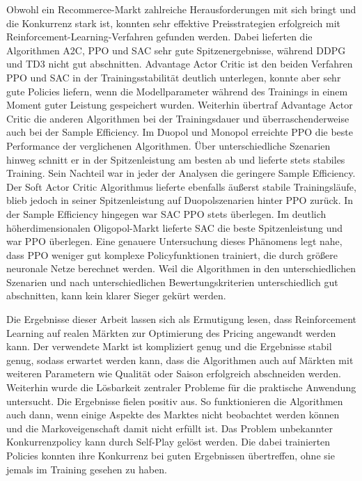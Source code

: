 Obwohl ein Recommerce-Markt zahlreiche Herausforderungen mit sich bringt und die Konkurrenz stark ist, konnten sehr effektive Preisstrategien erfolgreich mit Reinforcement-Learning-Verfahren gefunden werden.
Dabei lieferten die Algorithmen A2C, PPO und SAC sehr gute Spitzenergebnisse, während DDPG und TD3 nicht gut abschnitten.
Advantage Actor Critic ist den beiden Verfahren PPO und SAC in der Trainingsstabilität deutlich unterlegen, konnte aber sehr gute Policies liefern, wenn die Modellparameter während des Trainings in einem Moment guter Leistung gespeichert wurden.
Weiterhin übertraf Advantage Actor Critic die anderen Algorithmen bei der Trainingsdauer und überraschenderweise auch bei der Sample Efficiency.
Im Duopol und Monopol erreichte PPO die beste Performance der verglichenen Algorithmen.
Über unterschiedliche Szenarien hinweg schnitt er in der Spitzenleistung am besten ab und lieferte stets stabiles Training.
Sein Nachteil war in jeder der Analysen die geringere Sample Efficiency.
Der Soft Actor Critic Algorithmus lieferte ebenfalls äußerst stabile Trainingsläufe, blieb jedoch in seiner Spitzenleistung auf Duopolszenarien hinter PPO zurück.
In der Sample Efficiency hingegen war SAC PPO stets überlegen.
Im deutlich höherdimensionalen Oligopol-Markt lieferte SAC die beste Spitzenleistung und war PPO überlegen.
Eine genauere Untersuchung dieses Phänomens legt nahe, dass PPO weniger gut komplexe Policyfunktionen trainiert, die durch größere neuronale Netze berechnet werden.
Weil die Algorithmen in den unterschiedlichen Szenarien und nach unterschiedlichen Bewertungskriterien unterschiedlich gut abschnitten, kann kein klarer Sieger gekürt werden.

Die Ergebnisse dieser Arbeit lassen sich als Ermutigung lesen, dass Reinforcement Learning auf realen Märkten zur Optimierung des Pricing angewandt werden kann.
Der verwendete Markt ist kompliziert genug und die Ergebnisse stabil genug, sodass erwartet werden kann, dass die Algorithmen auch auf Märkten mit weiteren Parametern wie Qualität oder Saison erfolgreich abschneiden werden.
Weiterhin wurde die Lösbarkeit zentraler Probleme für die praktische Anwendung untersucht.
Die Ergebnisse fielen positiv aus.
So funktionieren die Algorithmen auch dann, wenn einige Aspekte des Marktes nicht beobachtet werden können und die Markoveigenschaft damit nicht erfüllt ist.
Das Problem unbekannter Konkurrenzpolicy kann durch Self-Play gelöst werden.
Die dabei trainierten Policies konnten ihre Konkurrenz bei guten Ergebnissen übertreffen, ohne sie jemals im Training gesehen zu haben.

